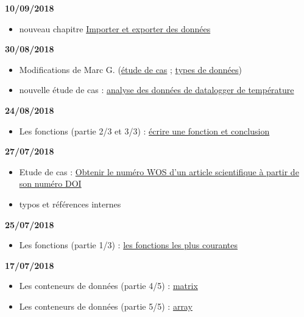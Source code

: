 \documentclass[]{book}
\providecommand{\tightlist}{%
  \setlength{\itemsep}{0pt}\setlength{\parskip}{0pt}}
\theoremstyle{definition}
\theoremstyle{definition}
\theoremstyle{definition}
\theoremstyle{remark}
\begin{document}
\textbf{10/09/2018}

\begin{itemize}
\tightlist
\item
  nouveau chapitre \protect\hyperlink{import}{Importer et exporter des
  données}
\end{itemize}

\textbf{30/08/2018}

\begin{itemize}
\tightlist
\item
  Modifications de Marc G. (\protect\hyperlink{studyCase002}{étude de
  cas} ; \protect\hyperlink{dataType1}{types de données})
\item
  nouvelle étude de cas : \protect\hyperlink{studyCase001}{analyse des
  données de datalogger de température}
\end{itemize}

\textbf{24/08/2018}

\begin{itemize}
\tightlist
\item
  Les fonctions (partie 2/3 et 3/3) :
  \protect\hyperlink{l015function}{écrire une fonction et conclusion}
\end{itemize}

\textbf{27/07/2018}

\begin{itemize}
\tightlist
\item
  Etude de cas : \protect\hyperlink{studyCase002}{Obtenir le numéro WOS
  d'un article scientifique à partir de son numéro DOI}
\item
  typos et références internes
\end{itemize}

\textbf{25/07/2018}

\begin{itemize}
\tightlist
\item
  Les fonctions (partie 1/3) : \protect\hyperlink{l015mainfun}{les
  fonctions les plus courantes}
\end{itemize}

\textbf{17/07/2018}

\begin{itemize}
\tightlist
\item
  Les conteneurs de données (partie 4/5) :
  \protect\hyperlink{l014matrix}{matrix}
\item
  Les conteneurs de données (partie 5/5) :
  \protect\hyperlink{l014array}{array}
\end{itemize}
\end{document}
